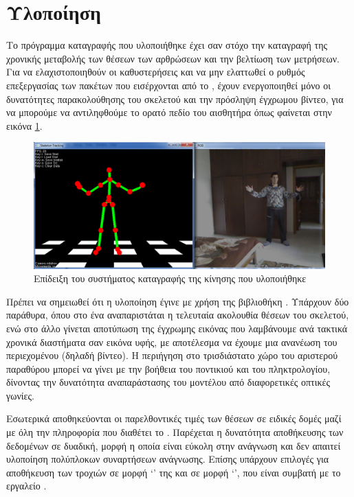 \section{Υλοποίηση}

Το πρόγραμμα καταγραφής που υλοποιήθηκε έχει σαν στόχο την καταγραφή της χρονικής μεταβολής των θέσεων των αρθρώσεων και την βελτίωση των μετρήσεων. Για να ελαχιστοποιηθούν οι καθυστερήσεις και να μην ελαττωθεί ο ρυθμός επεξεργασίας των πακέτων που εισέρχονται από το , έχουν ενεργοποιηθεί μόνο οι δυνατότητες παρακολούθησης του σκελετού και την πρόσληψη έγχρωμου βίντεο, για να μπορούμε να αντιληφθούμε το ορατό πεδίο του αισθητήρα όπως φαίνεται στην εικόνα \ref{fig:motion-capture}.

\begin{figure}[H]
    \centering
    \includegraphics[width=.9\textwidth]{kinect/fig/motion-capture.png}
    \caption{Επίδειξη του συστήματος καταγραφής της κίνησης που υλοποιήθηκε}
    \label{fig:motion-capture}
\end{figure}

Πρέπει να σημειωθεί ότι η υλοποίηση έγινε με χρήση της βιβλιοθήκη . Υπάρχουν δύο παράθυρα, όπου στο ένα αναπαριστάται η τελευταία ακολουθία θέσεων του σκελετού, ενώ στο άλλο γίνεται αποτύπωση της έγχρωμης εικόνας που λαμβάνουμε ανά τακτικά χρονικά διαστήματα σαν εικόνα υφής, με αποτέλεσμα να έχουμε μια ανανέωση του περιεχομένου (δηλαδή βίντεο). Η περιήγηση στο τρισδιάστατο χώρο του αριστερού παραθύρου μπορεί να γίνει με την βοήθεια του ποντικιού και του πληκτρολογίου, δίνοντας την δυνατότητα αναπαράστασης του μοντέλου από διαφορετικές οπτικές γωνίες.

Εσωτερικά αποθηκεύονται οι παρελθοντικές τιμές των θέσεων σε ειδικές δομές μαζί με όλη την πληροφορία που διαθέτει το . Παρέχεται η δυνατότητα αποθήκευσης των δεδομένων σε δυαδική, μορφή η οποία είναι εύκολη στην ανάγνωση και δεν απαιτεί υλοποίηση πολύπλοκων συναρτήσεων ανάγνωσης. Επίσης υπάρχουν επιλογές για αποθήκευση των τροχιών σε μορφή \lq {}\rq\; της  και σε μορφή \lq {}\rq  , που είναι συμβατή με το εργαλείο .
